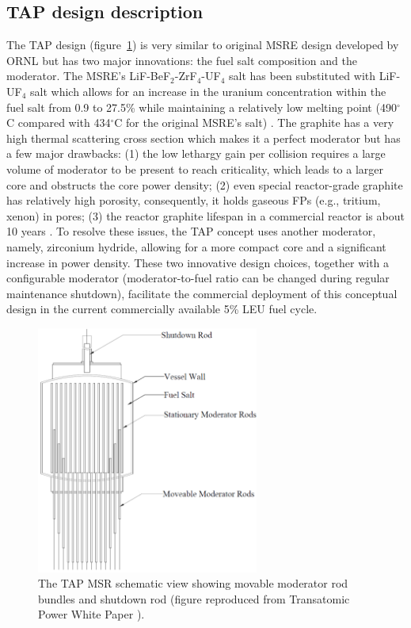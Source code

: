 \documentclass[12pt]{article} %
\begin{document}
\subsection{TAP design description}
The \gls{TAP} design (figure~\ref{fig:tap-main-view}) is very similar to original \gls{MSRE} design developed 
by \gls{ORNL} \cite{haubenreich_experience_1970} but has two major innovations: 
the fuel salt composition and the moderator. The \gls{MSRE}'s 
LiF-BeF$_2$-ZrF$_4$-UF$_4$ salt has been substituted with LiF-UF$_4$ salt which 
allows for an increase in the uranium concentration within the fuel salt from 0.9 to 
27.5\% while maintaining a relatively low melting point (490$^{\circ}$C compared 
with 434$^{\circ}$C for the original \gls{MSRE}'s salt) 
\cite{betzler_two-dimensional_2016}. The graphite has a very high 
thermal scattering cross section which makes it a perfect moderator but has 
a few major drawbacks: 
(1) the low lethargy gain per collision requires a large volume of moderator 
to be present to reach criticality, which leads to a larger core and obstructs 
the core power density; (2) even special 
reactor-grade graphite has relatively high porosity, consequently, it holds
gaseous \glspl{FP} 
(e.g., tritium, xenon) in pores; (3) the reactor graphite lifespan in a commercial 
reactor is about 10 years \cite{robertson_conceptual_1971}. To resolve these 
issues, the \gls{TAP} concept uses another 
moderator, namely, zirconium hydride, allowing for a more compact core and a 
significant increase in power density. These two innovative design choices,  
together with a configurable moderator 
(moderator-to-fuel ratio can be changed during regular maintenance shutdown), 
facilitate the commercial deployment of this conceptual design in the current 
commercially available 5\% \gls{LEU} fuel cycle. 
\begin{figure}[htp!] %
  		\hspace{+1.6in}
		  \includegraphics[width=0.65\textwidth]{tap_front_view.png}
  \caption{The \gls{TAP} \gls{MSR} schematic view showing movable moderator rod 
  bundles and shutdown rod (figure reproduced from Transatomic Power White Paper 
\cite{transatomic_power_corporation_technical_2016}).}
  \label{fig:tap-main-view}
\end{figure}
\end{document}
